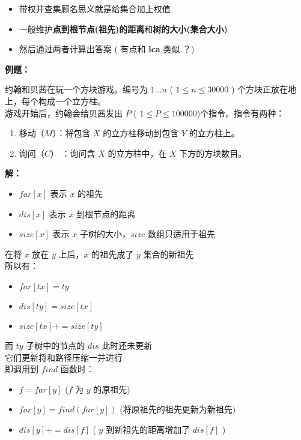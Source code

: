 \documentclass[E:/GsjzTle/main/main.tex]{subfiles}
\begin{document}
\begin{itemize}
\item
  带权并查集顾名思义就是给集合加上权值
\item
  一般维护\textbf{点到根节点(祖先)的距离}和\textbf{树的大小(集合大小)}
\item
  然后通过两者计算出答案 ( 有点和 \textbf{lca} 类似 ？)
\end{itemize}

\textbf{例题：}

约翰和贝茜在玩一个方块游戏。编号为 \(1\ldots n\) (
\(1 \leq n \leq 30000\) ) 个方块正放在地上，每个构成一个立方柱。\\
游戏开始后，约翰会给贝茜发出 \(P\) (
\(1 \leq P \leq 100000\))个指令。指令有两种：

\begin{enumerate}
\def\labelenumi{\arabic{enumi}.}
\item
  移动（\(M\)）：将包含 \(X\) 的立方柱移动到包含 \(Y\) 的立方柱上。
\item
  询问（\(C\)） ：询问含 \(X\) 的立方柱中，在 \(X\) 下方的方块数目。
\end{enumerate}

\textbf{解：}

\begin{itemize}
\item
  \(far[x]\) 表示 \(x\) 的祖先
\item
  \(dis[x]\) 表示 \(x\) 到根节点的距离
\item
  \(size[x]\) 表示 \(x\) 子树的大小，\(size\) 数组只适用于祖先
\end{itemize}

在将 \(x\) 放在 \(y\) 上后，\(x\) 的祖先成了 \(y\) 集合的新祖先\\
所以有：

\begin{itemize}
\item
  \(far[tx] = ty\)
\item
  \(dis[ty] = size[tx]\)
\item
  \(size[tx] += size[ty]\)
\end{itemize}

而 \(ty\) 子树中的节点的 \(dis\) 此时还未更新\\
它们更新将和路径压缩一并进行\\
即调用到 \(find\) 函数时：

\begin{itemize}
\item
  \(f = far[y]\) (\(f\) 为 \(y\) 的原祖先)
\item
  \(far[y] = find(far[y])\) (将原祖先的祖先更新为新祖先)
\item
  \(dis[y] += dis[f]\) ( \(y\) 到新祖先的距离增加了 \(dis[f]\) )
\end{itemize}
\end{document}
